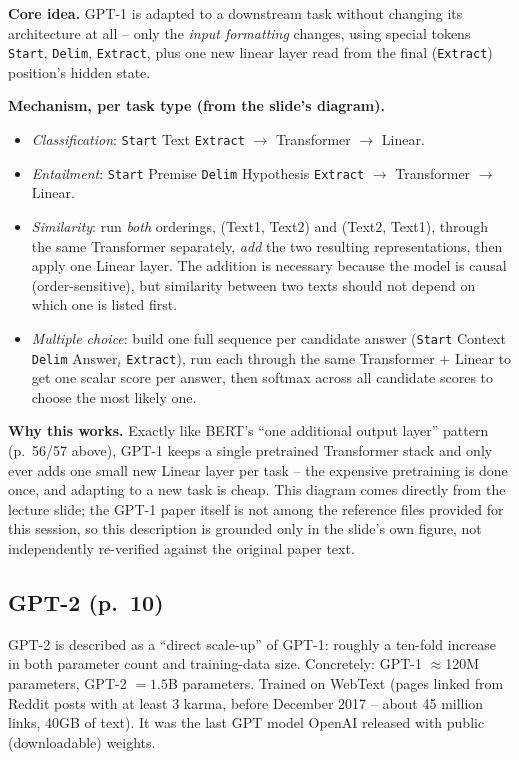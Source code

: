 \documentclass[11pt]{article}
\begin{document}
\textbf{Core idea.} GPT-1 is adapted to a downstream task without changing its architecture at all -- only the \emph{input formatting} changes, using special tokens \texttt{Start}, \texttt{Delim}, \texttt{Extract}, plus one new linear layer read from the final (\texttt{Extract}) position's hidden state.

\textbf{Mechanism, per task type (from the slide's diagram).}
\begin{itemize}
\item \emph{Classification}: \texttt{Start} Text \texttt{Extract} $\to$ Transformer $\to$ Linear.
\item \emph{Entailment}: \texttt{Start} Premise \texttt{Delim} Hypothesis \texttt{Extract} $\to$ Transformer $\to$ Linear.
\item \emph{Similarity}: run \emph{both} orderings, (Text1, Text2) and (Text2, Text1), through the same Transformer separately, \emph{add} the two resulting representations, then apply one Linear layer. The addition is necessary because the model is causal (order-sensitive), but similarity between two texts should not depend on which one is listed first.
\item \emph{Multiple choice}: build one full sequence per candidate answer (\texttt{Start} Context \texttt{Delim} Answer$_i$ \texttt{Extract}), run each through the same Transformer $+$ Linear to get one scalar score per answer, then softmax across all candidate scores to choose the most likely one.
\end{itemize}

\textbf{Why this works.} Exactly like BERT's ``one additional output layer'' pattern (p.\ 56/57 above), GPT-1 keeps a single pretrained Transformer stack and only ever adds one small new Linear layer per task -- the expensive pretraining is done once, and adapting to a new task is cheap. This diagram comes directly from the lecture slide; the GPT-1 paper itself is not among the reference files provided for this session, so this description is grounded only in the slide's own figure, not independently re-verified against the original paper text.

\subsection{GPT-2 (p.\ 10)}

GPT-2 is described as a ``direct scale-up'' of GPT-1: roughly a ten-fold increase in both parameter count and training-data size. Concretely: GPT-1 $\approx$120M parameters, GPT-2 $=1.5$B parameters. Trained on WebText (pages linked from Reddit posts with at least 3 karma, before December 2017 -- about 45 million links, 40GB of text). It was the last GPT model OpenAI released with public (downloadable) weights.
\end{document}
